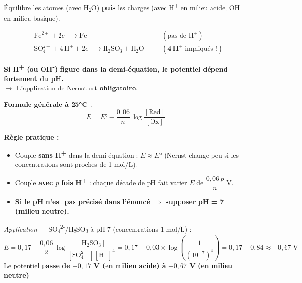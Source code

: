 \documentclass[a4paper, 11pt]{article}
\begin{document}
\vspace{4pt}

\begin{tcolorbox}[verdebox, title={Étape 2 — Écrire les demi-équations redox équilibrées}]
Équilibre les atomes (avec H\textsubscript{2}O) \textbf{puis} les charges (avec H\textsuperscript{+} en milieu acide, OH\textsuperscript{-} en milieu basique).

\medskip
\begin{align*}
  &\text{Fe}^{2+} + 2e^- \longrightarrow \text{Fe} &\quad& (\text{pas de H}^+)\\[4pt]
  &\text{SO}_4^{2-} + 4\,\text{H}^+ + 2e^- \longrightarrow \text{H}_2\text{SO}_3 + \text{H}_2\text{O} &\quad& (\mathbf{4\,\text{H}^+} \text{ impliqués !})
\end{align*}

\begin{tcolorbox}[alertebox, title={Point clé}]
  \textbf{Si H\textsuperscript{+} (ou OH\textsuperscript{-}) figure dans la demi-équation, le potentiel dépend fortement du pH.}\\
  $\Rightarrow$ L'application de Nernst est \textbf{obligatoire}.
\end{tcolorbox}
\end{tcolorbox}

\vspace{4pt}

\begin{tcolorbox}[verdebox, title={Étape 3 — Calculer les potentiels réels (loi de Nernst)}]

\textbf{Formule générale à 25°C :}
\[
  \boxed{E = E° - \frac{0{,}06}{n}\,\log\frac{[\text{Red}]}{[\text{Ox}]}}
\]

\textbf{Règle pratique :}
\begin{itemize}
  \item Couple \textbf{sans H\textsuperscript{+}} dans la demi-équation : $E \approx E°$ (Nernst change peu si les concentrations sont proches de 1 mol/L).
  \item Couple \textbf{avec $p$ fois H\textsuperscript{+}} : chaque décade de pH fait varier $E$ de $\dfrac{0{,}06\,p}{n}$ V.
  \item \textbf{Si le pH n'est pas précisé dans l'énoncé $\Rightarrow$ supposer pH = 7 (milieu neutre).}
\end{itemize}

\medskip
\textit{Application} — SO\textsubscript{4}\textsuperscript{2-}/H\textsubscript{2}SO\textsubscript{3} à pH 7 (concentrations 1 mol/L) :
\[
  E = 0{,}17 - \frac{0{,}06}{2}\,\log\frac{[\text{H}_2\text{SO}_3]}{[\text{SO}_4^{2-}][\text{H}^+]^4}
  = 0{,}17 - 0{,}03\times\log\!\left(\frac{1}{(10^{-7})^4}\right)
  = 0{,}17 - 0{,}84 \approx -0{,}67\;\text{V}
\]
Le potentiel \textbf{passe de $+0{,}17$ V (en milieu acide) à $-0{,}67$ V (en milieu neutre)}.

\end{tcolorbox}
\end{document}
